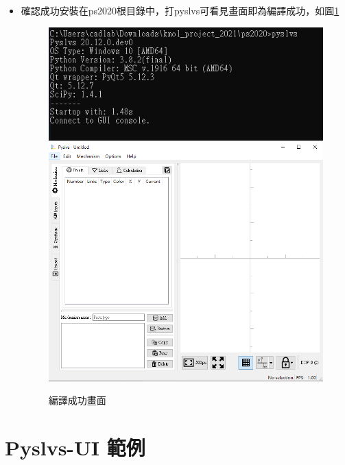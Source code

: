 \documentclass[14pt,a4paper]{report}  %
\begin{document}
		\begin{itemize}
		\item {確認成功安裝在ps2020根目錄中，打pyslvs可看見畫面即為編譯成功，如圖\ref{fig_pyslvs:scale}}
      \begin{figure}[hbt!]
        \centering
        \includegraphics[scale=0.6]{輸入pyslvs指令.PNG}
        \includegraphics[scale=0.5]{編譯成功畫面.png}
        \caption{編譯成功畫面}
        \label{fig_pyslvs:scale} 
    	\end{figure}
		\end{itemize}
      

      
    
      \section{Pyslvs-UI 範例}
\end{document}
